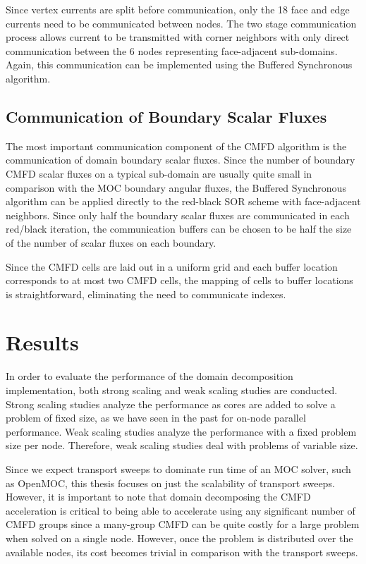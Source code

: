 Since vertex currents are split before communication, only the 18 face and edge currents need to be communicated between nodes. The two stage communication process allows current to be transmitted with corner neighbors with only direct communication between the 6 nodes representing face-adjacent sub-domains. Again, this communication can be implemented using the Buffered Synchronous algorithm.

\subsection{Communication of Boundary Scalar Fluxes}

The most important communication component of the \ac{CMFD} algorithm is the communication of domain boundary scalar fluxes. Since the number of boundary \ac{CMFD} scalar fluxes on a typical sub-domain are usually quite small in comparison with the \ac{MOC} boundary angular fluxes, the Buffered Synchronous algorithm can be applied directly to the red-black SOR scheme with face-adjacent neighbors. Since only half the boundary scalar fluxes are communicated in each red/black iteration, the communication buffers can be chosen to be half the size of the number of scalar fluxes on each boundary.

Since the \ac{CMFD} cells are laid out in a uniform grid and each buffer location corresponds to at most two \ac{CMFD} cells, the mapping of cells to buffer locations is straightforward, eliminating the need to communicate indexes.

\section{Results}
\label{sec:dd-results}

In order to evaluate the performance of the domain decomposition implementation, both strong scaling and weak scaling studies are conducted. Strong scaling studies analyze the performance as cores are added to solve a problem of fixed size, as we have seen in the past for on-node parallel performance. Weak scaling studies analyze the performance with a fixed problem size per node. Therefore, weak scaling studies deal with problems of variable size.

Since we expect transport sweeps to dominate run time of an \ac{MOC} solver, such as OpenMOC, this thesis focuses on just the scalability of transport sweeps. However, it is important to note that domain decomposing the \ac{CMFD} acceleration is critical to being able to accelerate using any significant number of \ac{CMFD} groups since a many-group \ac{CMFD} can be quite costly for a large problem when solved on a single node. However, once the problem is distributed over the available nodes, its cost becomes trivial in comparison with the transport sweeps.

